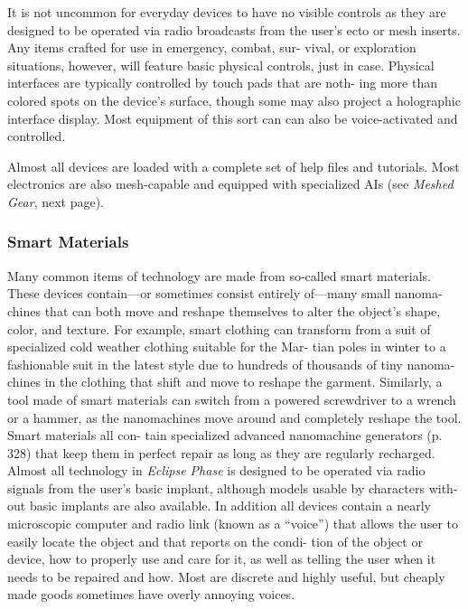 It is not uncommon for everyday devices to have no 
visible controls as they are designed to be operated via 
radio broadcasts from the user's ecto or mesh inserts. 
Any items crafted for use in emergency, combat, sur-
vival, or exploration situations, however, will feature 
basic physical controls, just in case. Physical interfaces 
are typically controlled by touch pads that are noth-
ing more than colored spots on the device's surface, 
though some may also project a holographic interface 
display. Most equipment of this sort can can also be 
voice-activated and controlled.

Almost all devices are loaded with a complete set 
of help files and tutorials. Most electronics are also 
mesh-capable and equipped with specialized AIs (see 
\textit{Meshed Gear}, next page).

\subsubsection{Smart Materials}

Many common items of technology are made from 
so-called smart materials. These devices contain—or 
sometimes consist entirely of—many small nanoma-
chines that can both move and reshape themselves 
to alter the object's shape, color, and texture. For 
example, smart clothing can transform from a suit of 
specialized cold weather clothing suitable for the Mar-
tian poles in winter to a fashionable suit in the latest 
style due to hundreds of thousands of tiny nanoma-
chines in the clothing that shift and move to reshape 
the garment. Similarly, a tool made of smart materials 
can switch from a powered screwdriver to a wrench 
or a hammer, as the nanomachines move around and 
completely reshape the tool. Smart materials all con-
tain specialized advanced nanomachine generators (p. 
328) that keep them in perfect repair as long as they 
are regularly recharged.
Almost all technology in \textit{Eclipse Phase} is designed 
to be operated via radio signals from the user's basic 
implant, although models usable by characters with-
out basic implants are also available. In addition all 
devices contain a nearly microscopic computer and 
radio link (known as a ``voice'') that allows the user to 
easily locate the object and that reports on the condi-
tion of the object or device, how to properly use and 
care for it, as well as telling the user when it needs 
to be repaired and how. Most are discrete and highly 
useful, but cheaply made goods sometimes have overly 
annoying voices.

